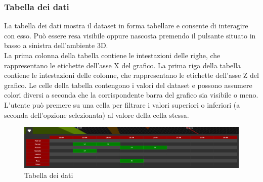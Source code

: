 \subsubsection{Tabella dei dati}
La tabella dei dati mostra il dataset in forma tabellare e consente di
interagire con esso. Può essere resa visibile oppure nascosta premendo il
pulsante situato in basso a sinistra dell'ambiente 3D.\\ La prima colonna della
tabella contiene le intestazioni delle righe, che rappresentano le etichette
dell'asse X del grafico. La prima riga della tabella contiene le intestazioni
delle colonne, che rappresentano le etichette dell'asse Z del grafico. Le celle
della tabella contengono i valori del dataset e possono assumere colori diversi
a seconda che la corrispondente barra del grafico sia visibile o meno.\\
L'utente può premere su una cella per filtrare i valori superiori o inferiori
(a seconda dell'opzione selezionata) al valore della cella stessa.
\begin{figure}[ht!]
    \centering
    \includegraphics[scale=0.29]{template/images/table.png}
    \caption{Tabella dei dati}
\end{figure}